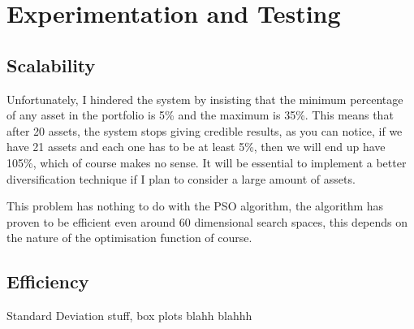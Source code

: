 \documentclass{pdfmx4020}
\begin{document}

  

  

  


\chapter{Experimentation and Testing}
  
  \section{Scalability} %
  \label{sec:scalability}
    Unfortunately, I hindered the system by insisting that the minimum percentage of any asset in the portfolio is 5\% and the maximum is 35\%. This means that after 20 assets, the system stops giving credible results, as you can notice, if we have 21 assets and each one has to be at least 5\%, then we will end up have 105\%, which of course makes no sense. It will be essential to implement a better diversification technique if I plan to consider a large amount of assets. 

    This problem has nothing to do with the PSO algorithm, the algorithm has proven to be efficient even around 60 dimensional search spaces, this depends on the nature of the optimisation function of course. 

  \section{Efficiency} %
  \label{sec:efficiency}
    Standard Deviation stuff, box plots blahh blahhh
\end{document}

